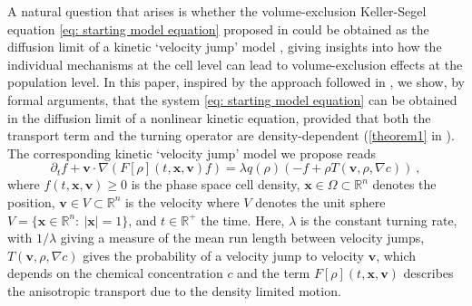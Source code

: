 \documentclass[review,onefignum,onetabnum]{siamart220329}
\begin{document}
A natural question that arises is whether the volume-exclusion Keller-Segel equation \cref{eq: starting model equation} proposed in 
 \cite{painter2002volume} could be obtained as the diffusion limit of a kinetic `velocity jump' model \cite{othmer1988models}, giving insights into how the individual mechanisms at the cell level can lead to volume-exclusion effects at the population level. In this paper, inspired by the approach followed in \cite{othmer2002diffusion,othmer2000diffusion}, we show, by formal arguments, that the system \cref{eq: starting model equation} can be obtained in the diffusion limit of a nonlinear kinetic equation, provided that both the transport term and the turning operator are density-dependent { (\cref{theorem1} in )}. The corresponding kinetic `velocity jump' model we propose reads 
\begin{equation}
    \partial_t f+\mathbf{v}\cdot \nabla(F[\rho](t,\mathbf{x},\mathbf{v}) f)= \lambda q(\rho)(-f+\rho T(\mathbf{v},\rho,\nabla c))\ ,\label{eq: inital model without scaling}
\end{equation} where $f(t,\mathbf{x},\mathbf{v}) \geq 0$ is the phase space cell density,  $\mathbf{x}\in \Omega \subset \mathbb{R}^n$ denotes the position, $\mathbf{v} \in V \subset \mathbb{R}^n$ is the velocity where $V$ denotes the unit sphere  $V=\{\mathbf{x}\in\mathbb{R}^n:\ |\mathbf{x}|=1 \}$, and  $t \in \mathbb{R}^+$ the time.
Here, $\lambda$ is the constant turning rate, with $1/\lambda$ giving a measure of the mean run length between velocity jumps, $T(\mathbf{v},\rho,\nabla c)$ gives the probability of a velocity jump to velocity $\mathbf{v}$, which depends on the chemical concentration $c$ and the term $F[\rho](t,\mathbf{x},\mathbf{v})$ describes the anisotropic transport due to the density limited motion.
\end{document}
